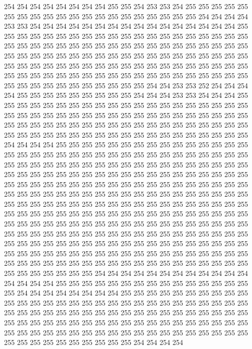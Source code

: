 254 254 254 254 254 254 254 254 255 255 254 253 253 254 255 255 255 255 255 255
255 255 255 255 255 255 255 255 255 255 255 255 255 255 254 254 254 254 253 253
254 254 254 254 254 254 254 254 254 254 254 254 254 254 254 254 255 255 255 255
255 255 255 255 255 255 255 255 255 255 255 255 255 255 255 255 255 255 255 255
255 255 255 255 255 255 255 255 255 255 255 255 255 255 255 255 255 255 255 255
255 255 255 255 255 255 255 255 255 255 255 255 255 255 255 255 255 255 255 255
255 255 255 255 255 255 255 255 255 255 255 255 255 255 255 255 255 255 255 255
255 255 255 255 255 255 255 255 255 255 255 255 255 255 255 255 255 255 255 255
255 255 255 254 254 253 253 252 254 254 254 254 255 255 255 255 255 255 255 255
255 254 254 254 253 253 254 254 254 255 255 255 255 255 255 255 255 255 255 255
255 255 255 255 255 255 255 255 255 255 255 255 255 255 255 255 255 255 255 255
255 255 255 255 255 255 255 255 255 255 255 255 255 255 255 255 255 255 255 255
255 255 255 255 255 255 255 255 255 255 255 255 255 255 255 255 255 255 255 255
255 255 255 255 255 255 254 254 254 254 255 255 255 255 255 255 255 255 255 255
255 255 255 255 255 255 255 255 255 255 255 255 255 255 255 255 255 255 255 255
255 255 255 255 255 255 255 255 255 255 255 255 255 255 255 255 255 255 255 255
255 255 255 255 255 255 255 255 255 255 255 255 255 255 255 255 255 255 255 255
255 255 255 255 255 255 255 255 255 255 255 255 255 255 255 255 255 255 255 255
255 255 255 255 255 255 255 255 255 255 255 255 255 255 255 255 255 255 255 255
255 255 255 255 255 255 255 255 255 255 255 255 255 255 255 255 255 255 255 255
255 255 255 255 255 255 255 255 255 255 255 255 255 255 255 255 255 255 255 255
255 255 255 255 255 255 255 255 255 255 255 255 255 255 255 255 255 255 255 255
255 255 255 255 255 255 255 255 255 255 255 255 255 255 255 255 255 255 255 255
255 255 255 255 255 255 255 255 255 255 255 255 255 255 255 255 255 255 255 255
255 255 255 255 255 255 255 255 255 255 255 255 255 255 255 255 255 255 255 255
255 255 255 255 255 255 255 255 255 255 255 255 255 255 255 255 255 255 255 255
254 254 254 254 254 254 254 254 254 254 254 254 254 254 254 254 255 255 255 255
255 255 255 255 255 255 255 255 255 255 255 255 254 254 254 254 254 254 254 254
255 255 255 255 255 255 255 255 255 255 255 255 255 255 255 255 255 255 255 255
255 255 255 255 255 255 255 255 255 255 255 255 255 255 255 255 255 255 255 255
255 255 255 255 255 255 255 255 255 255 255 255 255 255 255 255 255 255 255 255
255 255 255 255 255 255 255 255 255 255 255 255 255 255 255 255 255 255 255 255
255 255 255 255 255 255 255 255 255 255 255 255 255 255 255 255 254 254 254 254
